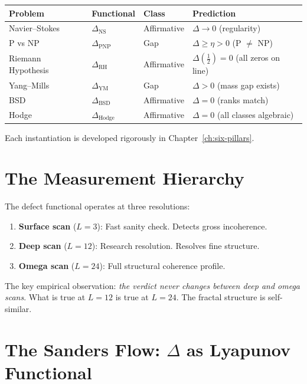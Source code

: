 \documentclass[12pt, openany]{book}
\theoremstyle{remark}
\begin{document}
\begin{center}
\begin{tabular}{llll}
\toprule
\textbf{Problem} & \textbf{Functional} & \textbf{Class} & \textbf{Prediction} \\
\midrule
Navier--Stokes    & $\Delta_{\mathrm{NS}}$    & Affirmative & $\Delta \to 0$ (regularity) \\
P vs NP           & $\Delta_{\mathrm{PNP}}$   & Gap         & $\Delta \geq \eta > 0$ (P $\neq$ NP) \\
Riemann Hypothesis& $\Delta_{\mathrm{RH}}$    & Affirmative & $\Delta(\tfrac{1}{2}) = 0$ (all zeros on line) \\
Yang--Mills       & $\Delta_{\mathrm{YM}}$    & Gap         & $\Delta > 0$ (mass gap exists) \\
BSD               & $\Delta_{\mathrm{BSD}}$   & Affirmative & $\Delta = 0$ (ranks match) \\
Hodge             & $\Delta_{\mathrm{Hodge}}$ & Affirmative & $\Delta = 0$ (all classes algebraic) \\
\bottomrule
\end{tabular}
\end{center}

Each instantiation is developed rigorously in Chapter~\ref{ch:six-pillars}.

\section{The Measurement Hierarchy}

The defect functional operates at three resolutions:
\begin{enumerate}
  \item \textbf{Surface scan} ($L = 3$): Fast sanity check. Detects gross incoherence.
  \item \textbf{Deep scan} ($L = 12$): Research resolution. Resolves fine structure.
  \item \textbf{Omega scan} ($L = 24$): Full structural coherence profile.
\end{enumerate}

The key empirical observation: \emph{the verdict never changes between deep and omega
scans}. What is true at $L = 12$ is true at $L = 24$. The fractal structure is
self-similar.

\section{The Sanders Flow: $\Delta$ as Lyapunov Functional}
\label{sec:sanders-flow}
\end{document}
